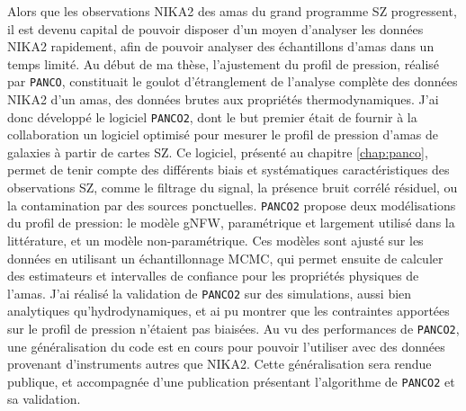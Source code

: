 Alors que les observations NIKA2 des amas du grand programme SZ progressent, il est devenu capital de pouvoir disposer d'un moyen d'analyser les données NIKA2 rapidement, afin de pouvoir analyser des échantillons d'amas dans un temps limité.
Au début de ma thèse, l’ajustement du profil de pression, réalisé par \texttt{PANCO}, constituait le goulot d’étranglement de l’analyse complète des données NIKA2 d’un amas, des données brutes aux propriétés thermodynamiques.
J'ai donc développé le logiciel \texttt{\texttt{PANCO}2}, dont le but premier était de fournir à la collaboration un logiciel optimisé pour mesurer le profil de pression d'amas de galaxies à partir de cartes SZ.
Ce logiciel, présenté au chapitre \ref{chap:panco}, permet de tenir compte des différents biais et systématiques caractéristiques des observations SZ, comme le filtrage du signal, la présence bruit corrélé résiduel, ou la contamination par des sources ponctuelles.
\texttt{PANCO2} propose deux modélisations du profil de pression: le modèle gNFW, paramétrique et largement utilisé dans la littérature, et un modèle non-paramétrique.
Ces modèles sont ajusté sur les données en utilisant un échantillonnage MCMC, qui permet ensuite de calculer des estimateurs et intervalles de confiance pour les propriétés physiques de l'amas.
J'ai réalisé la validation de \texttt{PANCO2} sur des simulations, aussi bien analytiques qu'hydrodynamiques, et ai pu montrer que les contraintes apportées sur le profil de pression n'étaient pas biaisées.
Au vu des performances de \texttt{PANCO2}, une généralisation du code est en cours pour pouvoir l'utiliser avec des données provenant d'instruments autres que NIKA2.
Cette généralisation sera rendue publique, et accompagnée d'une publication présentant l'algorithme de \texttt{PANCO2} et sa validation.

